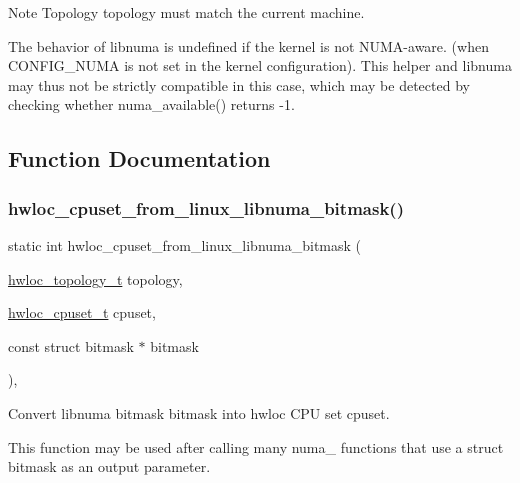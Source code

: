 \begin{DoxyNote}{Note}
Topology {\ttfamily topology} must match the current machine.

The behavior of libnuma is undefined if the kernel is not N\+U\+M\+A-\/aware. (when C\+O\+N\+F\+I\+G\+\_\+\+N\+U\+MA is not set in the kernel configuration). This helper and libnuma may thus not be strictly compatible in this case, which may be detected by checking whether numa\+\_\+available() returns -\/1. 
\end{DoxyNote}


\subsection{Function Documentation}
\mbox{\label{a00216_ga37c8421110b1842414809019098794ef}} 
\subsubsection{\texorpdfstring{hwloc\+\_\+cpuset\+\_\+from\+\_\+linux\+\_\+libnuma\+\_\+bitmask()}{hwloc\_cpuset\_from\_linux\_libnuma\_bitmask()}}
{\footnotesize\ttfamily static int hwloc\+\_\+cpuset\+\_\+from\+\_\+linux\+\_\+libnuma\+\_\+bitmask (\begin{DoxyParamCaption}\item[{\hyperlink{a00186_ga9d1e76ee15a7dee158b786c30b6a6e38}{hwloc\+\_\+topology\+\_\+t}}]{topology,  }\item[{\hyperlink{a00183_ga4bbf39b68b6f568fb92739e7c0ea7801}{hwloc\+\_\+cpuset\+\_\+t}}]{cpuset,  }\item[{const struct bitmask $\ast$}]{bitmask }\end{DoxyParamCaption})\hspace{0.3cm}{\ttfamily [inline]}, {\ttfamily [static]}}



Convert libnuma bitmask {\ttfamily bitmask} into hwloc C\+PU set {\ttfamily cpuset}. 

This function may be used after calling many numa\+\_\+ functions that use a struct bitmask as an output parameter. \mbox{\label{a00216_gad8769b4544c0aeef154fc8223144e343}} 
